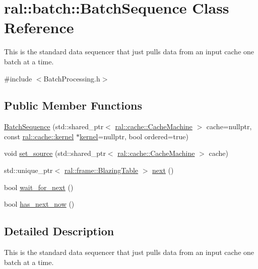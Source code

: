 \hypertarget{classral_1_1batch_1_1BatchSequence}{}\section{ral\+:\+:batch\+:\+:Batch\+Sequence Class Reference}
\label{classral_1_1batch_1_1BatchSequence}


This is the standard data sequencer that just pulls data from an input cache one batch at a time.  




{\ttfamily \#include $<$Batch\+Processing.\+h$>$}

\subsection*{Public Member Functions}
\begin{DoxyCompactItemize}
\item 
\hyperlink{classral_1_1batch_1_1BatchSequence_a1012a9622924b621edd667400038b24d}{Batch\+Sequence} (std\+::shared\+\_\+ptr$<$ \hyperlink{classral_1_1cache_1_1CacheMachine}{ral\+::cache\+::\+Cache\+Machine} $>$ cache=nullptr, const \hyperlink{classral_1_1cache_1_1kernel}{ral\+::cache\+::kernel} $\ast$\hyperlink{classral_1_1cache_1_1kernel}{kernel}=nullptr, bool ordered=true)
\item 
void \hyperlink{classral_1_1batch_1_1BatchSequence_a92ce0d4e310caded265fceab3f4c266a}{set\+\_\+source} (std\+::shared\+\_\+ptr$<$ \hyperlink{classral_1_1cache_1_1CacheMachine}{ral\+::cache\+::\+Cache\+Machine} $>$ cache)
\item 
std\+::unique\+\_\+ptr$<$ \hyperlink{classral_1_1frame_1_1BlazingTable}{ral\+::frame\+::\+Blazing\+Table} $>$ \hyperlink{classral_1_1batch_1_1BatchSequence_a5fe181e6183df338739e61eb512c23a4}{next} ()
\item 
bool \hyperlink{classral_1_1batch_1_1BatchSequence_af62f1f620ac02a018737af8a89eb4881}{wait\+\_\+for\+\_\+next} ()
\item 
bool \hyperlink{classral_1_1batch_1_1BatchSequence_a0ed0531f11f65b4e7391da23c2a2de12}{has\+\_\+next\+\_\+now} ()
\end{DoxyCompactItemize}


\subsection{Detailed Description}
This is the standard data sequencer that just pulls data from an input cache one batch at a time. 

